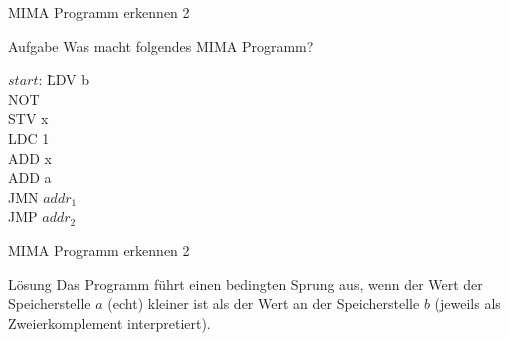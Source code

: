 \begin{frame}{MIMA Programm erkennen 2}
	\begin{block}{Aufgabe}
		Was macht folgendes MIMA Programm?
		\begin{tabbing}
		$start$: 	\quad \quad \= LDV b \\
								\> NOT \\
								\> STV x \\
								\> LDC 1 \\
								\> ADD x \\
								\> ADD a \\
								\> JMN $addr_1$ \\
								\> JMP $addr_2$ \\
		\end{tabbing}
	\end{block}
\end{frame}
\begin{frame}{MIMA Programm erkennen 2}
	\begin{block}{Lösung}
		Das Programm führt einen bedingten Sprung aus, wenn der Wert der Speicherstelle $a$ (echt) kleiner ist als der Wert an der Speicherstelle $b$ (jeweils als Zweierkomplement interpretiert).
	\end{block}
\end{frame}

\newcommand{\inferrule}[2]{\displaystyle\frac{\quad #1 \quad}{\quad #2 \quad}}
\newcommand{\rulename}[1]{{~\textsf{\scriptsize(#1)}}}
\newcommand{\schlussregeln}{
	\centering
	\begin{displaymath}
		\begin{array}
			{c@{\hspace{2cm}}c} \displaystyle
			\inferrule{A \quad B}{A \aland B} \rulename{$\aland$I}
			 & \inferrule{A \aland B}{A}\rulename{$\aland$E$_l$} \quad
			\inferrule{A \aland B}{B} \rulename{$\aland$E$_r$}                                \\[2ex]
			\inferrule{A}{A \alor B}\rulename{$\alor$I$_l$} \quad
			\inferrule{B}{A \alor B}\rulename{$\alor$I$_r$}
			 & \inferrule{A \alor B\quad A \alimpl C \quad B \alimpl C}{C}\rulename{$\alor$E} \\[2ex]
			\inferrule{A \alvdash B}{A \alimpl B}\rulename{$\alimpl$I}
			 & \inferrule{A \quad A \alimpl B}{B}\rulename{MP}\rulename{$\alimpl$E}           \\[2ex]
			\inferrule{A \alimpl \alfalse}{\alnot A}\rulename{$\alnot$I}
			 & \inferrule{A \quad \alnot A}{\alfalse}\rulename{$\alnot$E} \quad
			\inferrule{\alnot \alnot A}{A}\rulename{$\alnot\alnot$E}
			\\[2ex]
			\inferrule{\alnot A \alimpl \alfalse}{A}\rulename{RAA}
			 & \inferrule{}{A \alvdash A}\rulename{Ax}
		\end{array}
	\end{displaymath}
}

